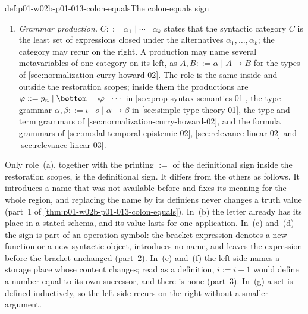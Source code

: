 \begin{hbconvention}{def:p01-w02b-p01-013-colon-equals}{The colon-equals sign}
\begin{enumerate}
  \cref{sec:p02-w02-p02-019-two-sat} or
  the step \(C:=E(C)\) of the procedure in
  \cref{sec:p08-ranked-models-rational-closure} stores a value under a name
  of the algorithm; later steps may replace it.  The role is the same inside
  the restoration scopes: in the pseudocode listing of the DPLL procedure in
  \cref{sec:automated-reasoning-01}, the step
  \(r:=\mathrm{DPLL}(\ldots)\) stores the result of the first recursive
  call, and every call of the procedure stores its own result under \(r\).
  \item[(g)] \emph{Grammar production.}  \(C::=\alpha_1\mid\cdots\mid
  \alpha_k\) states that the syntactic category \(C\) is the least set of
  expressions closed under the alternatives \(\alpha_1,\ldots,\alpha_k\); the
  category may recur on the right.  A production may name several
  metavariables of one category on its left, as \(A,B::=\alpha\mid A\to B\)
  for the types of \cref{sec:normalization-curry-howard-02}.  The role is
  the same inside and outside the restoration scopes; inside them the
  productions are \(\varphi::=p_n\mid\bottom\mid\neg\varphi\mid\cdots\) in
  \cref{sec:prop-syntax-semantics-01}, the type grammar
  \(\alpha,\beta::=\iota\mid o\mid\alpha\to\beta\) in
  \cref{sec:simple-type-theory-01}, the type and term grammars of
  \cref{sec:normalization-curry-howard-02}, and the formula grammars of
  \cref{sec:modal-temporal-epistemic-02}, \cref{sec:relevance-linear-02}
  and \cref{sec:relevance-linear-03}.
\end{enumerate}
Only role~(a), together with the printing \(\mathrel{:=}\) of the
definitional sign inside the restoration scopes, is the definitional sign.
It differs from the others as follows.  It introduces a name that was not available before and fixes its
meaning for the whole region, and replacing the name by its definiens never
changes a truth value (part~1 of \cref{thm:p01-w02b-p01-013-colon-equals}).
In~(b) the letter already has its place in a stated schema, and its value
lasts for one application.  In~(c) and~(d) the sign is part of an operation
symbol: the bracket expression denotes a new function or a new syntactic
object, introduces no name, and leaves the expression before the bracket
unchanged (part~2).  In~(e) and~(f) the left side names a storage place
whose content changes; read as a definition, \(i:=i+1\) would define a
number equal to its own successor, and there is none (part~3).  In~(g) a
set is defined inductively, so the left side recurs on the right without a
smaller argument.
\end{hbconvention}


